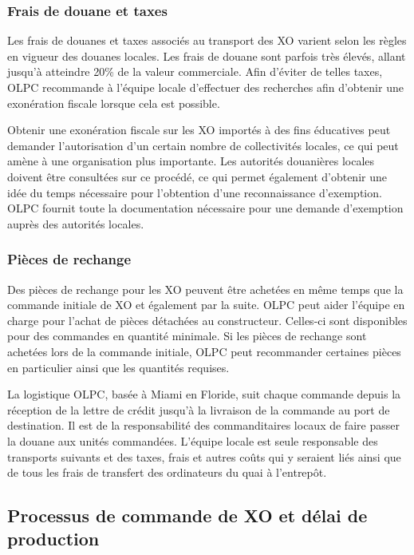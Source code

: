 \documentclass[11pt]{article}
\begin{document}
\subsubsection{Frais de douane et taxes}
\label{sec-8-2-3}



Les frais de douanes et taxes associés au transport des XO varient selon
les règles en vigueur des douanes locales. Les frais de douane sont parfois
très élevés, allant jusqu'à atteindre 20\% de la valeur commerciale. Afin
d'éviter de telles taxes, OLPC recommande à l'équipe locale d'effectuer des
recherches afin d'obtenir une exonération fiscale lorsque cela est
possible.


Obtenir une exonération fiscale sur les XO importés à des fins éducatives
peut demander l'autorisation d'un certain nombre de collectivités locales,
ce qui peut amène à une organisation plus importante. Les autorités
douanières locales doivent être consultées sur ce procédé, ce qui permet
également d'obtenir une idée du temps nécessaire pour l'obtention d'une
reconnaissance d'exemption. OLPC fournit toute la documentation nécessaire
pour une demande d'exemption auprès des autorités locales.
\subsubsection{Pièces de rechange}
\label{sec-8-2-4}




Des pièces de rechange pour les XO peuvent être achetées en même temps que
la commande initiale de XO et également par la suite. OLPC peut aider
l'équipe en charge pour l'achat de pièces détachées au
constructeur. Celles-ci sont disponibles pour des commandes en quantité
minimale. Si les pièces de rechange sont achetées lors de la commande
initiale, OLPC peut recommander certaines pièces en particulier ainsi que
les quantités requises.

La logistique OLPC, basée à Miami en Floride, suit chaque commande depuis
la réception de la lettre de crédit jusqu'à la livraison de la commande au
port de destination. Il est de la responsabilité des commanditaires locaux
de faire passer la douane aux unités commandées. L'équipe locale est seule
responsable des transports suivants et des taxes, frais et autres coûts qui
y seraient liés ainsi que de tous les frais de transfert des ordinateurs du
quai à l'entrepôt.
\subsection{Processus de commande de XO et délai de production}
\label{sec-8-3}
\end{document}
